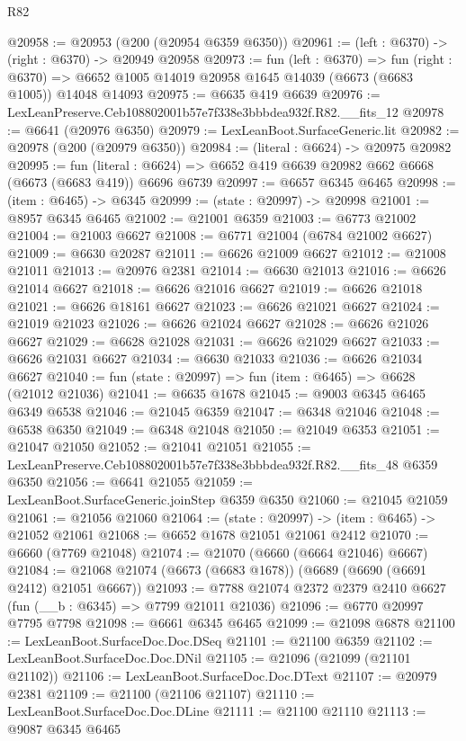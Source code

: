 \begin{lexlean}{R82}
\begin{coremodule}
@20958 := @20953 (@200 (@20954 @6359 @6350))
@20961 := (left : @6370) -> (right : @6370) -> @20949 @20958
@20973 := fun (left : @6370) =>
  fun (right : @6370) => @6652 @1005 @14019 @20958 @1645 @14039 (@6673 (@6683 @1005)) @14048 @14093
@20975 := @6635 @419 @6639
@20976 := LexLeanPreserve.Ceb108802001b57e7f338e3bbbdea932f.R82.__fits_12
@20978 := @6641 (@20976 @6350)
@20979 := LexLeanBoot.SurfaceGeneric.lit
@20982 := @20978 (@200 (@20979 @6350))
@20984 := (literal : @6624) -> @20975 @20982
@20995 := fun (literal : @6624) =>
  @6652 @419 @6639 @20982 @662 @6668 (@6673 (@6683 @419)) @6696 @6739
@20997 := @6657 @6345 @6465
@20998 := (item : @6465) -> @6345
@20999 := (state : @20997) -> @20998
@21001 := @8957 @6345 @6465
@21002 := @21001 @6359
@21003 := @6773 @21002
@21004 := @21003 @6627
@21008 := @6771 @21004 (@6784 @21002 @6627)
@21009 := @6630 @20287
@21011 := @6626 @21009 @6627
@21012 := @21008 @21011
@21013 := @20976 @2381
@21014 := @6630 @21013
@21016 := @6626 @21014 @6627
@21018 := @6626 @21016 @6627
@21019 := @6626 @21018
@21021 := @6626 @18161 @6627
@21023 := @6626 @21021 @6627
@21024 := @21019 @21023
@21026 := @6626 @21024 @6627
@21028 := @6626 @21026 @6627
@21029 := @6628 @21028
@21031 := @6626 @21029 @6627
@21033 := @6626 @21031 @6627
@21034 := @6630 @21033
@21036 := @6626 @21034 @6627
@21040 := fun (state : @20997) => fun (item : @6465) => @6628 (@21012 @21036)
@21041 := @6635 @1678
@21045 := @9003 @6345 @6465 @6349 @6538
@21046 := @21045 @6359
@21047 := @6348 @21046
@21048 := @6538 @6350
@21049 := @6348 @21048
@21050 := @21049 @6353
@21051 := @21047 @21050
@21052 := @21041 @21051
@21055 := LexLeanPreserve.Ceb108802001b57e7f338e3bbbdea932f.R82.__fits_48 @6359 @6350
@21056 := @6641 @21055
@21059 := LexLeanBoot.SurfaceGeneric.joinStep @6359 @6350
@21060 := @21045 @21059
@21061 := @21056 @21060
@21064 := (state : @20997) -> (item : @6465) -> @21052 @21061
@21068 := @6652 @1678 @21051 @21061 @2412
@21070 := @6660 (@7769 @21048)
@21074 := @21070 (@6660 (@6664 @21046) @6667)
@21084 := @21068 @21074 (@6673 (@6683 @1678)) (@6689 (@6690 (@6691 @2412) @21051 @6667))
@21093 := @7788 @21074 @2372 @2379 @2410 @6627 (fun (__b : @6345) => @7799 @21011 @21036)
@21096 := @6770 @20997 @7795 @7798
@21098 := @6661 @6345 @6465
@21099 := @21098 @6878
@21100 := LexLeanBoot.SurfaceDoc.Doc.DSeq
@21101 := @21100 @6359
@21102 := LexLeanBoot.SurfaceDoc.Doc.DNil
@21105 := @21096 (@21099 (@21101 @21102))
@21106 := LexLeanBoot.SurfaceDoc.Doc.DText
@21107 := @20979 @2381
@21109 := @21100 (@21106 @21107)
@21110 := LexLeanBoot.SurfaceDoc.Doc.DLine
@21111 := @21100 @21110
@21113 := @9087 @6345 @6465

\end{coremodule}
\end{lexlean}
